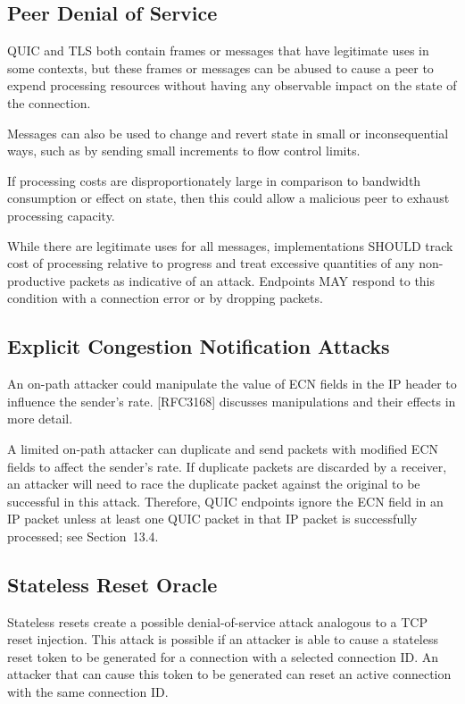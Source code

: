 \documentclass{article}
\begin{document}
\subsection{Peer Denial of Service}

QUIC and TLS both contain frames or messages that have legitimate uses in some contexts, but these frames or messages can be abused to cause a peer to expend processing resources without having any observable impact on the state of the connection.

Messages can also be used to change and revert state in small or inconsequential ways, such as by sending small increments to flow control limits.

If processing costs are disproportionately large in comparison to bandwidth consumption or effect on state, then this could allow a malicious peer to exhaust processing capacity.

While there are legitimate uses for all messages, implementations SHOULD track cost of processing relative to progress and treat excessive quantities of any non-productive packets as indicative of an attack.  Endpoints MAY respond to this condition with a connection error or by dropping packets.

\subsection{Explicit Congestion Notification Attacks}

An on-path attacker could manipulate the value of ECN fields in the IP header to influence the sender's rate.  [RFC3168] discusses manipulations and their effects in more detail.

A limited on-path attacker can duplicate and send packets with modified ECN fields to affect the sender's rate.  If duplicate packets are discarded by a receiver, an attacker will need to race the duplicate packet against the original to be successful in this attack.  Therefore, QUIC endpoints ignore the ECN field in an IP packet unless at least one QUIC packet in that IP packet is successfully processed; see Section~13.4.

\subsection{Stateless Reset Oracle}

Stateless resets create a possible denial-of-service attack analogous to a TCP reset injection.  This attack is possible if an attacker is able to cause a stateless reset token to be generated for a connection with a selected connection ID.  An attacker that can cause this token to be generated can reset an active connection with the same connection ID.
\end{document}
